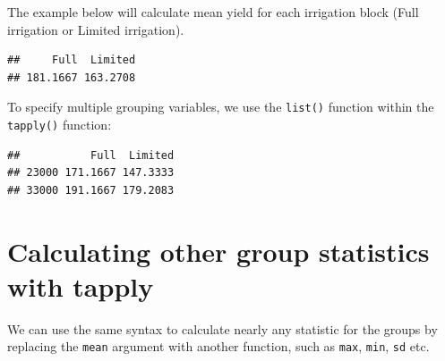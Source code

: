 \documentclass[letterpaper,]{book}
\newenvironment{Shaded}{\begin{snugshade}}{\end{snugshade}}
\newcommand{\KeywordTok}[1]{\textcolor[rgb]{0.13,0.29,0.53}{\textbf{#1}}}
\newcommand{\NormalTok}[1]{#1}
\newcommand{\OperatorTok}[1]{\textcolor[rgb]{0.81,0.36,0.00}{\textbf{#1}}}
\newcommand{\StringTok}[1]{\textcolor[rgb]{0.31,0.60,0.02}{#1}}
\begin{document}
The example below will calculate mean yield for each irrigation block (Full irrigation or Limited irrigation).

\begin{Shaded}
\end{Shaded}

\begin{verbatim}
##     Full  Limited 
## 181.1667 163.2708
\end{verbatim}

To specify multiple grouping variables, we use the \texttt{list()} function within the \texttt{tapply()} function:

\begin{Shaded}
\end{Shaded}

\begin{verbatim}
##           Full  Limited
## 23000 171.1667 147.3333
## 33000 191.1667 179.2083
\end{verbatim}

\hypertarget{calculating-other-group-statistics-with-tapply}{%
\section{Calculating other group statistics with tapply}\label{calculating-other-group-statistics-with-tapply}}

We can use the same syntax to calculate nearly any statistic for the groups by replacing the \texttt{mean} argument with another function, such as \texttt{max}, \texttt{min}, \texttt{sd} etc.

\begin{Shaded}
\end{Shaded}
\end{document}
